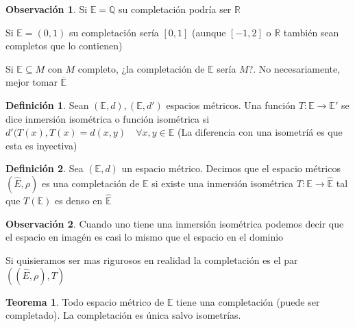 \documentclass[12pt]{article}
\newcommand{\Q}{\mathbb{Q}}
\newcommand{\R}{\mathbb{R}}
\newcommand{\E}{\mathbb{E}}
\newcommand{\ra}{\rightarrow}
\newcommand{\ol}{\overline}
\theoremstyle{definition}
\newtheorem{definition}{Definición}[section]
\newtheorem*{remark}{Observación}
\newtheorem{theorem}{Teorema}
\begin{document}
\begin{remark}
  Si $\E = \Q$ su completación podría ser $\R$

  Si $\E = (0,1)$ su completación sería $[0,1]$ (aunque $[-1,2]$ o $\R$ también sean completos que lo contienen)

  Si $\E \subseteq M$ con $M$ completo, ¿la completación de $\E$ sería $M$?. No necesariamente, mejor tomar $\ol{\E}$
\end{remark}
\begin{definition} 
  Sean $(\E,d), (\E,d')$ espacios métricos. Una función $T : \E \ra \E '$ se dice inmersión isométrica o función isométrica si $d'(T(x),T(x) = d(x,y) \quad \forall x,y \in \E$ (La diferencia con una isometríá es que esta es inyectiva)
\end{definition}
\begin{definition}
  Sea $(\E,d)$ un espacio métrico. Decimos que el espacio métricos $(\hat{E},\rho)$ es una completación de $\E$ si existe una inmersión isométrica $T: \E \ra \hat{\E}$ tal que $T(\E)$ es denso en $\hat{\E}$ 
\end{definition}
\begin{remark}
  Cuando uno tiene una inmersión isométrica podemos decir que el espacio en imagén es casi lo mismo que el espacio en el dominio

Si quisieramos ser mas rigurosos en realidad la completación es el par $((\hat{E},\rho), T)$
\end{remark}
\begin{theorem}
  Todo espacio métrico de $\E$ tiene una completación (puede ser completado). La completación es única salvo isometrías.
\end{theorem}
\end{document}
